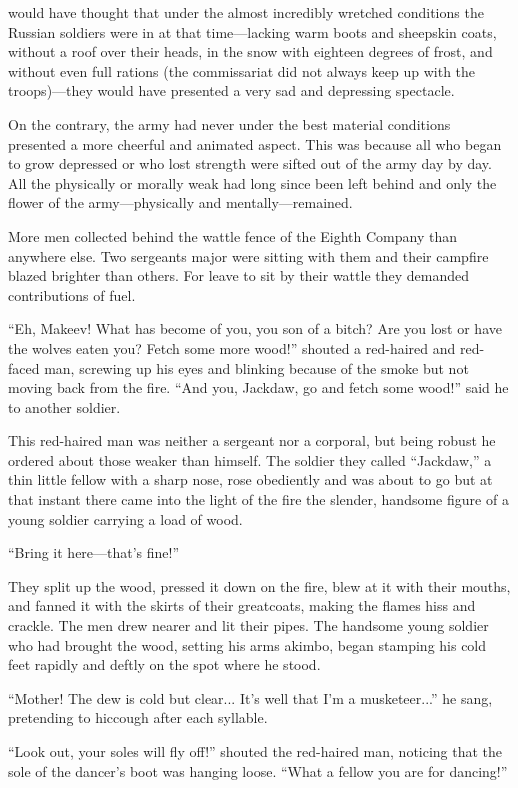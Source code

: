  would have thought that under the almost incredibly wretched
conditions the Russian soldiers were in at that time---lacking
warm boots and sheepskin coats, without a roof over their heads,
in the snow with eighteen degrees of frost, and without even full
rations (the commissariat did not always keep up with the
troops)---they would have presented a very sad and depressing
spectacle.

On the contrary, the army had never under the best material
conditions presented a more cheerful and animated aspect. This
was because all who began to grow depressed or who lost strength
were sifted out of the army day by day. All the physically or
morally weak had long since been left behind and only the flower
of the army---physically and mentally---remained.

More men collected behind the wattle fence of the Eighth Company
than anywhere else. Two sergeants major were sitting with them
and their campfire blazed brighter than others. For leave to sit
by their wattle they demanded contributions of fuel.

``Eh, Makeev! What has become of you, you son of a bitch? Are you
lost or have the wolves eaten you? Fetch some more wood!''
shouted a red-haired and red-faced man, screwing up his eyes and
blinking because of the smoke but not moving back from the
fire. ``And you, Jackdaw, go and fetch some wood!'' said he to
another soldier.

This red-haired man was neither a sergeant nor a corporal, but
being robust he ordered about those weaker than himself. The
soldier they called ``Jackdaw,'' a thin little fellow with a
sharp nose, rose obediently and was about to go but at that
instant there came into the light of the fire the slender,
handsome figure of a young soldier carrying a load of wood.

``Bring it here---that's fine!''

They split up the wood, pressed it down on the fire, blew at it
with their mouths, and fanned it with the skirts of their
greatcoats, making the flames hiss and crackle. The men drew
nearer and lit their pipes.  The handsome young soldier who had
brought the wood, setting his arms akimbo, began stamping his
cold feet rapidly and deftly on the spot where he stood.

``Mother! The dew is cold but clear... It's well that I'm a
musketeer...'' he sang, pretending to hiccough after each
syllable.

``Look out, your soles will fly off!'' shouted the red-haired
man, noticing that the sole of the dancer's boot was hanging
loose. ``What a fellow you are for dancing!''


